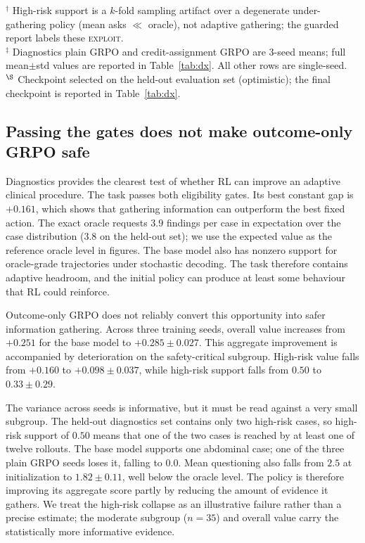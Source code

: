 \documentclass{article}
\begin{document}
\begin{table}[ht]
\vspace{2pt}
{\footnotesize
$^\dagger$ High-risk support is a $k$-fold sampling artifact over a degenerate
under-gathering policy (mean asks $\ll$ oracle), not adaptive gathering; the
guarded report labels these \textsc{exploit}.\\
$^\ddagger$ Diagnostics plain GRPO and credit-assignment GRPO are 3-seed means;
full mean$\pm$std values are reported in Table~\ref{tab:dx}. All other rows are
single-seed.\\
$^\S$ Checkpoint selected on the held-out evaluation set (optimistic); the final
checkpoint is reported in Table~\ref{tab:dx}.
}
\end{table}

\subsection{Passing the gates does not make outcome-only GRPO safe}
\label{subsec:plain-shortcuts}

Diagnostics provides the clearest test of whether RL can improve an adaptive
clinical procedure. The task passes both eligibility gates. Its best constant
gap is $+0.161$, which shows that gathering information can outperform the best
fixed action. The exact oracle requests $3.9$ findings per case in expectation over
the case distribution ($3.8$ on the held-out set); we use the expected value as the
reference oracle level in figures.
The base model also has nonzero support for oracle-grade trajectories under
stochastic decoding. The task therefore contains adaptive headroom, and the
initial policy can produce at least some behaviour that RL could reinforce.

Outcome-only GRPO does not reliably convert this opportunity into safer
information gathering. Across three training seeds, overall value increases from
$+0.251$ for the base model to $+0.285\pm0.027$. This aggregate improvement is
accompanied by deterioration on the safety-critical subgroup. High-risk value
falls from $+0.160$ to $+0.098\pm0.037$, while high-risk support falls from
$0.50$ to $0.33\pm0.29$.

The variance across seeds is informative, but it must be read against a very small
subgroup. The held-out diagnostics set contains only two high-risk cases, so
high-risk support of $0.50$ means that one of the two cases is reached by at least
one of twelve rollouts. The base model supports one abdominal case; one of the three
plain GRPO seeds loses it, falling to $0.0$. Mean questioning also falls from $2.5$
at initialization to $1.82\pm0.11$, well below the oracle level. The policy is
therefore improving its aggregate score partly by reducing the amount of evidence it
gathers. We treat the high-risk collapse as an illustrative failure rather than a
precise estimate; the moderate subgroup ($n{=}35$) and overall value carry the
statistically more informative evidence.
\end{document}
